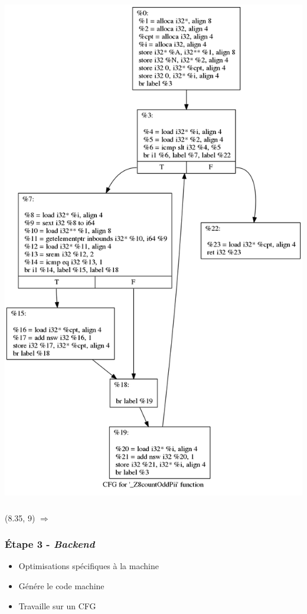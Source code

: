 \documentclass{beamer}
\begin{document}
\begin{frame}
\begin{columns}
\begin{column}{0.5\textwidth}
\begin{center}
\colorbox{white}{\includegraphics[scale=0.13]{cfg.png}}
\end{center}
\end{column}
\end{columns}
\begin{textblock}{6}(8.35, 9)
\Huge{$\Rightarrow$}
\end{textblock}
\end{frame}

\begin{frame}
\frametitle{Étape 3 - \textit{Backend}}
\begin{itemize}
\item Optimisations spécifiques à la machine
\item Génére le code machine
\item Travaille sur un CFG
\end{itemize}
\end{frame}
\end{document}
